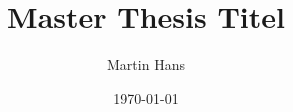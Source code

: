 \titlehead{{\Large Hochschule für Technik Stuttgart 
	\hfill WS~2013/2014\\} 
		Fakultät Vermessung, Mathematik, Informatik\\ 
		Schellingstraße 24\\ 
		70174 Stuttgart} 
\title{Master Thesis Titel}
\author{Martin Hans}

\date{\today} 
\publishers{\textbf{Supervisors:} Prof Dr. Marcus Deininger, Dipl. Ing. Tim Dauer} 